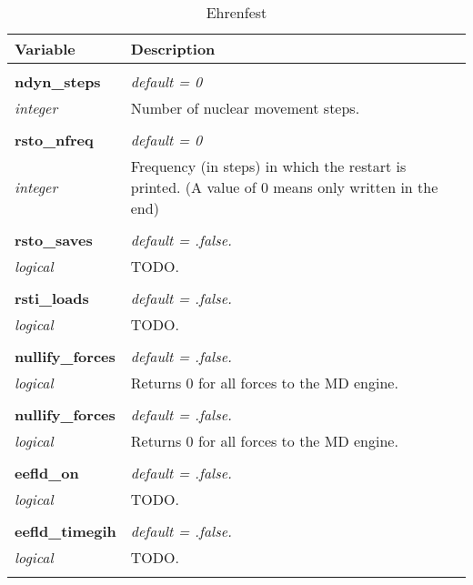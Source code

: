 \begin{Spacing}{1.0}
\begin{longtable}{ p{} p{} }

   \toprule
   \textbf{Variable} & Description \\*
   \midrule \\*
   \endhead

   \bottomrule
   \caption{Ehrenfest}
   \endfoot

   \textbf{ndyn\_steps}
   &  \textit{default = 0}
   \\*\textit{integer}
   & Number of nuclear movement steps.\\* \\

   \textbf{rsto\_nfreq}
   &  \textit{default = 0}
   \\*\textit{integer}
   & Frequency (in steps) in which the restart is printed.
   (A value of 0 means only written in the end)\\* \\

   \textbf{rsto\_saves}
   &  \textit{default = .false. }
   \\*\textit{logical}
   & TODO.\\* \\

   \textbf{rsti\_loads}
   &  \textit{default = .false. }
   \\*\textit{logical}
   & TODO.\\* \\

   \textbf{nullify\_forces}
   &  \textit{default = .false. }
   \\*\textit{logical}
   & Returns 0 for all forces to the MD engine.\\* \\

   \textbf{nullify\_forces}
   &  \textit{default = .false. }
   \\*\textit{logical}
   & Returns 0 for all forces to the MD engine.\\* \\

   \textbf{eefld\_on}
   &  \textit{default = .false. }
   \\*\textit{logical}
   & TODO.\\* \\

   \textbf{eefld\_timegih}
   &  \textit{default = .false. }
   \\*\textit{logical}
   & TODO.\\* \\


\end{longtable}
\end{Spacing}
